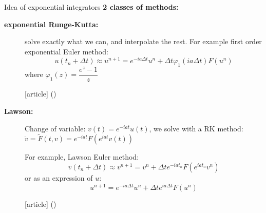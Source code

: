 \documentclass{beamer}
\newcommand{\customcite}[1]{\citeauthor{#1} (\citeyear{#1})}
\begin{document}
\begin{frame}{Idea of exponential integrators}
  \textbf{\color{mblue} 2 classes of methods:}
  \begin{description}
    \item[\textbf{exponential Runge-Kutta:}] solve exactly what we can, and interpolate the rest. For example first order exponential Euler method:
      $$
        u(t_n+\Delta t) \approx u^{n+1} = e^{-ia\Delta t}u^n + \Delta t\varphi_1(ia\Delta t)F(u^n)
      $$
      where $\varphi_1(z) = \dfrac{e^z - 1}{z}$
      \begin{thebibliography}{9}
        [article]
         \customcite{Hochbruck:2010}
      \end{thebibliography}
    \item[\textbf{Lawson:}] Change of variable: $v(t)=e^{-iat}u(t)$, we solve with a RK method: $\dot{v} = \tilde{F}(t,v) = e^{-iat}F(e^{iat}v(t))$

      For example, Lawson Euler method:
      $$
        v(t_n+\Delta t)\approx v^{n+1} = v^n + \Delta t e^{-iat_n}F(e^{iat_n}v^n)
      $$
      or as an expression of $u$:
      $$
        u^{n+1} = e^{-ia\Delta t}u^n + \Delta te^{ia\Delta t}F(u^n)
      $$
      \begin{thebibliography}{9}
        [article]
         \customcite{Isherwood:2018}
      \end{thebibliography}
  \end{description}
\end{frame}
\end{document}
